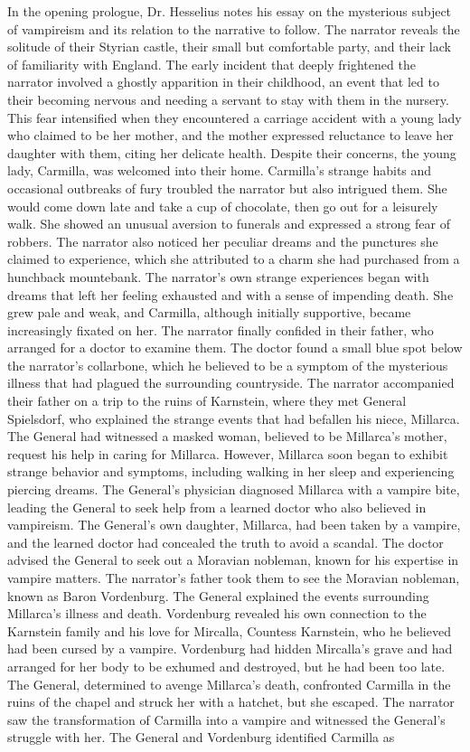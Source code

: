 \documentclass{article} %
\begin{document}
In the opening prologue, Dr. Hesselius notes his essay on the mysterious subject of vampireism and its relation to the narrative to follow. The narrator reveals the solitude of their Styrian castle, their small but comfortable party, and their lack of familiarity with England. The early incident that deeply frightened the narrator involved a ghostly apparition in their childhood, an event that led to their becoming nervous and needing a servant to stay with them in the nursery. This fear intensified when they encountered a carriage accident with a young lady who claimed to be her mother, and the mother expressed reluctance to leave her daughter with them, citing her delicate health. Despite their concerns, the young lady, Carmilla, was welcomed into their home. Carmilla's strange habits and occasional outbreaks of fury troubled the narrator but also intrigued them. She would come down late and take a cup of chocolate, then go out for a leisurely walk. She showed an unusual aversion to funerals and expressed a strong fear of robbers. \textcolor{skipred}{The narrator also noticed her peculiar dreams and the punctures she claimed to experience, which she attributed to a charm she had purchased from a hunchback mountebank.} The narrator's own strange experiences began with dreams that left her feeling exhausted and with a sense of impending death. She grew pale and weak, and Carmilla, although initially supportive, became increasingly fixated on her. The narrator finally confided in their father, who arranged for a doctor to examine them. The doctor found a small blue spot below the narrator's collarbone, which he believed to be a symptom of the mysterious illness that had plagued the surrounding countryside. The narrator accompanied their father on a trip to the ruins of Karnstein, where they met General Spielsdorf, who explained the strange events that had befallen his niece, Millarca. The General had witnessed a masked woman, believed to be Millarca's mother, request his help in caring for Millarca. However, Millarca soon began to exhibit strange behavior and symptoms, including walking in her sleep and experiencing piercing dreams. The General's physician diagnosed Millarca with a vampire bite, leading the General to seek help from a learned doctor who also believed in vampireism. \textcolor{skipred}{The General's own daughter, Millarca, had been taken by a vampire, and the learned doctor had concealed the truth to avoid a scandal. The doctor advised the General to seek out a Moravian nobleman, known for his expertise in vampire matters.} The narrator's father took them to see the Moravian nobleman, known as Baron Vordenburg. The General explained the events surrounding Millarca's illness and death. Vordenburg revealed his own connection to the Karnstein family and his love for Mircalla, Countess Karnstein, who he believed had been cursed by a vampire. Vordenburg had hidden Mircalla's grave and had arranged for her body to be exhumed and destroyed, but he had been too late. The General, determined to avenge Millarca's death, confronted Carmilla in the ruins of the chapel and struck her with a hatchet, but she escaped. The narrator saw the transformation of Carmilla into a vampire and witnessed the General's struggle with her. The General and Vordenburg identified Carmilla as 
\end{document}
